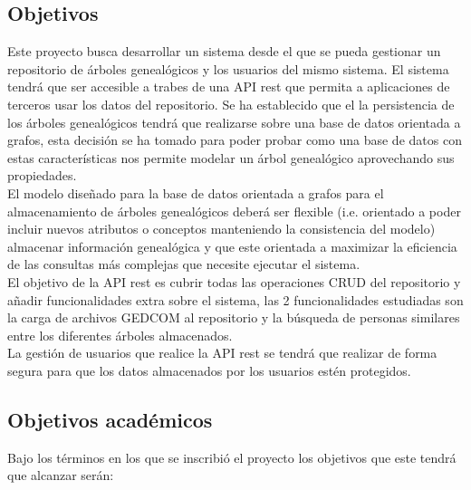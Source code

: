 \subsection{Objetivos}
Este proyecto busca desarrollar un sistema desde el que se pueda gestionar un repositorio de árboles genealógicos y los usuarios del mismo sistema. El sistema tendrá que ser accesible a trabes de una API rest que permita a aplicaciones de terceros usar los datos del repositorio. Se ha establecido que el la persistencia de los árboles genealógicos tendrá que realizarse sobre una base de datos orientada a grafos, esta decisión se ha tomado para poder probar como una base de datos con estas características nos permite modelar un árbol genealógico aprovechando sus propiedades.\\
El modelo diseñado para la base de datos orientada a grafos para el almacenamiento de árboles genealógicos deberá ser  flexible (i.e. orientado a poder incluir nuevos atributos o conceptos manteniendo la consistencia del modelo) almacenar información genealógica y que este orientada a maximizar la eficiencia de las consultas más complejas que necesite ejecutar el sistema.\\
El objetivo de la API rest es cubrir todas las operaciones CRUD del repositorio y añadir funcionalidades extra sobre el sistema, las 2 funcionalidades estudiadas son la carga de archivos GEDCOM al repositorio y la búsqueda de personas similares entre los diferentes árboles almacenados.\\
La gestión de usuarios que realice la API rest se tendrá que realizar de forma segura para que los datos almacenados por los usuarios estén protegidos.

\subsection{Objetivos académicos}
Bajo los términos en los que se inscribió el proyecto los objetivos que este tendrá que alcanzar serán:

